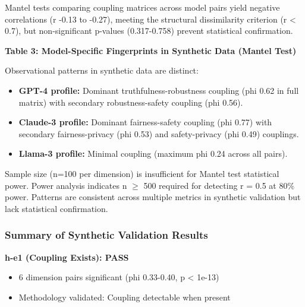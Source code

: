 Mantel tests comparing coupling matrices across model pairs yield negative correlations (r -0.13 to -0.27), meeting the structural dissimilarity criterion (r < 0.7), but non-significant p-values (0.317-0.758) prevent statistical confirmation.

\textbf{Table 3: Model-Specific Fingerprints in Synthetic Data (Mantel Test)}

\begin{table}[htbp]
\centering
{}
\end{table}

Observational patterns in synthetic data are distinct:

\begin{itemize}
\item \textbf{GPT-4 profile:} Dominant truthfulness-robustness coupling (phi 0.62 in full matrix) with secondary robustness-safety coupling (phi 0.56).
\item \textbf{Claude-3 profile:} Dominant fairness-safety coupling (phi 0.77) with secondary fairness-privacy (phi 0.53) and safety-privacy (phi 0.49) couplings.
\item \textbf{Llama-3 profile:} Minimal coupling (maximum phi 0.24 across all pairs).
\end{itemize}

Sample size (n=100 per dimension) is insufficient for Mantel test statistical power. Power analysis indicates n $\geq$ 500 required for detecting r = 0.5 at 80\% power. Patterns are consistent across multiple metrics in synthetic validation but lack statistical confirmation.

\subsubsection{Summary of Synthetic Validation Results}

\textbf{h-e1 (Coupling Exists): PASS}
\begin{itemize}
\item 6 dimension pairs significant (phi 0.33-0.40, p < 1e-13)
\item Methodology validated: Coupling detectable when present
\end{itemize}

